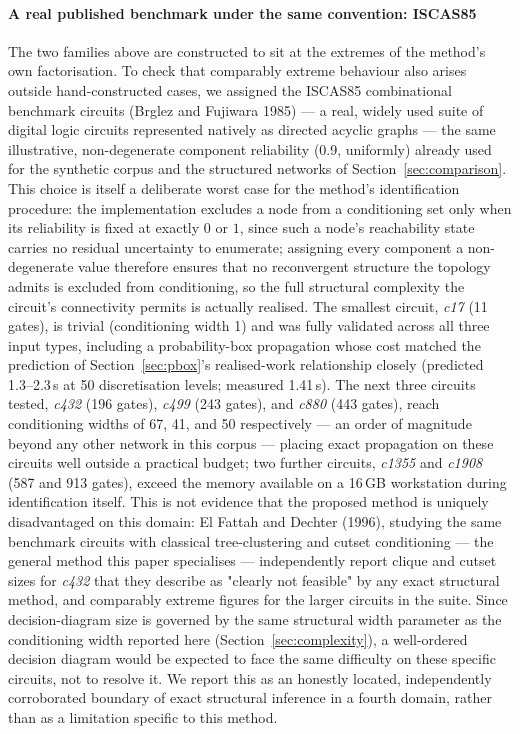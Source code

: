 \documentclass[preprint,12pt]{elsarticle}
\theoremstyle{definition}
\begin{document}
\paragraph{A real published benchmark under the same convention: ISCAS85} The two families above are
constructed to sit at the extremes of the method's own factorisation. To check that comparably extreme
behaviour also arises outside hand-constructed cases, we assigned the ISCAS85 combinational benchmark
circuits (Brglez and Fujiwara 1985) --- a real, widely used suite of digital logic circuits represented
natively as directed acyclic graphs --- the same illustrative, non-degenerate component reliability (0.9,
uniformly) already used for the synthetic corpus and the structured networks of Section~\ref{sec:comparison}.
This choice is itself a deliberate worst case for the method's identification procedure: the
implementation excludes a node from a conditioning set only when its reliability is fixed at exactly $0$
or $1$, since such a node's reachability state carries no residual uncertainty to enumerate; assigning
every component a non-degenerate value therefore ensures that no reconvergent structure the topology
admits is excluded from conditioning, so the full structural complexity the circuit's connectivity permits
is actually realised.
The smallest circuit, \emph{c17} (11 gates), is trivial (conditioning width 1) and was fully validated
across all three input types, including a probability-box propagation whose cost matched the prediction of
Section~\ref{sec:pbox}'s realised-work relationship closely (predicted 1.3--2.3\,s at 50 discretisation
levels; measured 1.41\,s). The next three circuits tested, \emph{c432} (196 gates), \emph{c499} (243
gates), and \emph{c880} (443 gates), reach conditioning widths of 67, 41, and 50 respectively --- an order
of magnitude beyond any other network in this corpus --- placing exact propagation on these circuits well
outside a practical budget; two further circuits, \emph{c1355} and \emph{c1908} (587 and 913 gates), exceed
the memory available on a 16\,GB workstation during identification itself. This is not evidence that the
proposed method is uniquely disadvantaged on this domain: El Fattah and Dechter (1996), studying the same
benchmark circuits with classical tree-clustering and cutset conditioning --- the general method this paper
specialises --- independently report clique and cutset sizes for \emph{c432} that they describe as "clearly
not feasible" by any exact structural method, and comparably extreme figures for the larger circuits in the
suite. Since decision-diagram size is governed by the same structural width parameter as the conditioning
width reported here (Section~\ref{sec:complexity}), a well-ordered decision diagram would be expected to
face the same difficulty on these specific circuits, not to resolve it. We report this as an honestly
located, independently corroborated boundary of exact structural inference in a fourth domain, rather than
as a limitation specific to this method.
\end{document}
